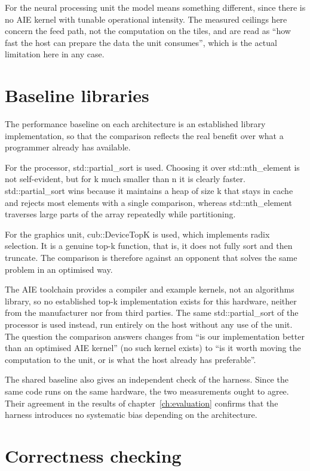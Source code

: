 For the neural processing unit the model means something different, since there
is no AIE kernel with tunable operational intensity. The measured ceilings here
concern the feed path, not the computation on the tiles, and are read as ``how
fast the host can prepare the data the unit consumes'', which is the actual
limitation here in any case.

\section{Baseline libraries}
\label{sec:meth-baseline-libraries}

The performance baseline on each architecture is an established library
implementation, so that the comparison reflects the real benefit over what a
programmer already has available.

For the processor, std::partial\_sort is used. Choosing it over
std::nth\_element is not self-evident, but for k much smaller than n it is
clearly faster. std::partial\_sort wins because it maintains a heap of size k
that stays in cache and rejects most elements with a single comparison, whereas
std::nth\_element traverses large parts of the array repeatedly while
partitioning.

For the graphics unit, cub::DeviceTopK is used, which implements radix
selection. It is a genuine top-k function, that is, it does not fully sort and
then truncate. The comparison is therefore against an opponent that solves the
same problem in an optimised way.

The AIE toolchain provides a compiler and example kernels, not an algorithms
library, so no established top-k implementation exists for this hardware,
neither from the manufacturer nor from third parties. The same
std::partial\_sort of the processor is used instead, run entirely on the host
without any use of the unit. The question the comparison answers changes from
``is our implementation better than an optimised AIE kernel'' (no such kernel
exists) to ``is it worth moving the computation to the unit, or is what the
host already has preferable''.

The shared baseline also gives an independent check of the harness. Since the
same code runs on the same hardware, the two measurements ought to agree. Their
agreement in the results of chapter~\ref{ch:evaluation} confirms that the
harness introduces no systematic bias depending on the architecture.

\section{Correctness checking}
\label{sec:meth-correctness}

